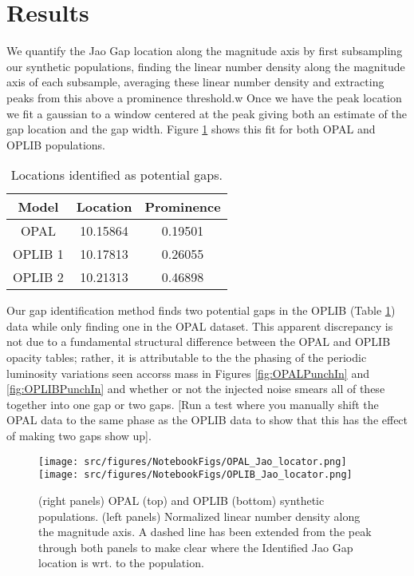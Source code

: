 \section{Results}\label{sec:results}
We quantify the Jao Gap location along the magnitude axis by first subsampling
our synthetic populations, finding the linear number density along the
magnitude axis of each subsample, averaging these linear number density and
extracting peaks from this above a prominence threshold.w Once we have the peak
location we fit a gaussian to a window centered at the peak giving both an
estimate of the gap location and the gap width. Figure \ref{fig:JaoGapLocator}
shows this fit for both OPAL and OPLIB populations.

\begin{table}
	\centering
	\begin{tabular}{c | c c}
		\hline
		Model & Location & Prominence \\
		\hline
		\hline
		OPAL & 10.15864 & 0.19501 \\
		OPLIB 1 & 10.17813 & 0.26055 \\
		OPLIB 2 & 10.21313 & 0.46898
	\end{tabular}
	\caption{Locations identified as potential gaps.}
	\label{tab:GapLocation}
\end{table}

Our gap identification method finds two potential gaps in the OPLIB (Table
\ref{tab:GapLocation}) data while only finding one in the OPAL dataset. This
apparent discrepancy is not due to a fundamental structural difference between
the OPAL and OPLIB opacity tables; rather, it is attributable to the the
phasing of the periodic luminosity variations seen accorss mass in Figures
\ref{fig:OPALPunchIn} and \ref{fig:OPLIBPunchIn} and whether or not the
injected noise smears all of these together into one gap or two gaps.
{\color{red} [Run a test where you manually shift the OPAL data to the same
phase as the OPLIB data to show that this has the effect of making two gaps
show up]}.

\begin{figure}
	\centering
	\texttt{[image: src/figures/NotebookFigs/OPAL\_Jao\_locator.png]}
	\texttt{[image: src/figures/NotebookFigs/OPLIB\_Jao\_locator.png]}
	\caption{(right panels) OPAL (top) and OPLIB (bottom) synthetic
	populations. (left panels) Normalized linear number density along the
	magnitude axis. A dashed line has been extended from the peak through both
	panels to make clear where the Identified Jao Gap location is wrt. to the
	population. }
	\label{fig:JaoGapLocator}
\end{figure}

